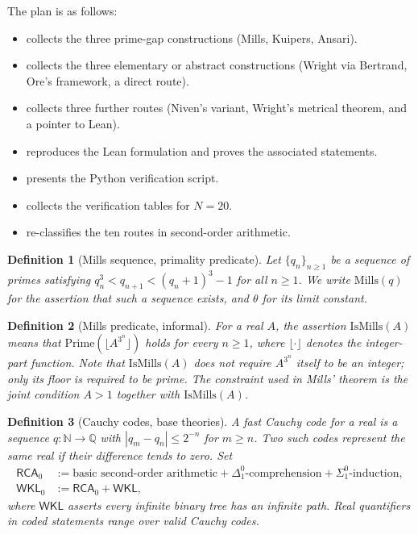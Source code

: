 \documentclass[11pt,reqno]{amsart}
\providecommand{\N}{\mathbb{N}}
\providecommand{\Q}{\mathbb{Q}}
\theoremstyle{redplain}
\newtheorem{definition}{Definition}[section]
\numberwithin{equation}{section}
\begin{document}
\noindent The plan is as follows:
\begin{itemize}
\item {} collects the three prime-gap constructions
      (Mills, Kuipers, Ansari).
\item {} collects the three elementary or abstract
      constructions (Wright via Bertrand, Ore's framework, a direct route).
\item {} collects three further routes (Niven's variant,
      Wright's metrical theorem, and a pointer to Lean).
\item {} reproduces the Lean formulation and proves the
      associated statements.
\item {} presents the Python verification script.
\item {} collects the verification tables for $N=20$.
\item {} re-classifies the ten routes in second-order
      arithmetic.
\end{itemize}

\begin{definition}[Mills sequence, primality predicate]
\label{def:mills-seq}
Let $\{q_n\}_{n\ge1}$ be a sequence of primes satisfying
$q_n^3<q_{n+1}<(q_n+1)^3-1$ for all $n\ge1$. We write $\mathrm{Mills}(q)$
for the assertion that such a sequence exists, and $\theta$ for its limit
constant.
\end{definition}

\begin{definition}[Mills predicate, informal]
\label{def:ismills-intro}
For a real $A$, the assertion $\mathrm{IsMills}(A)$ means that
$\mathrm{Prime}(\lfloor A^{3^n}\rfloor)$ holds for every $n\ge1$, where
$\lfloor\cdot\rfloor$ denotes the integer-part function. Note that
$\mathrm{IsMills}(A)$ does \emph{not} require $A^{3^n}$ itself to be an
integer; only its floor is required to be prime. The constraint used in
Mills' theorem is the joint condition $A>1$ together with
$\mathrm{IsMills}(A)$.
\end{definition}

\begin{definition}[Cauchy codes, base theories]
\label{def:cauchy}
A fast Cauchy code for a real is a sequence $q:\N\to\Q$ with
$|q_m-q_n|\le 2^{-n}$ for $m\ge n$. Two such codes represent the same real
if their difference tends to zero. Set
\[
\begin{aligned}
\mathsf{RCA}_0&:=\text{basic second-order arithmetic}
 +\Delta^0_1\text{-comprehension}+\Sigma^0_1\text{-induction},\\
\mathsf{WKL}_0&:=\mathsf{RCA}_0+\mathsf{WKL},
\end{aligned}
\]
where $\mathsf{WKL}$ asserts every infinite binary tree has an infinite
path. Real quantifiers in coded statements range over valid Cauchy codes.
\end{definition}
\end{document}
